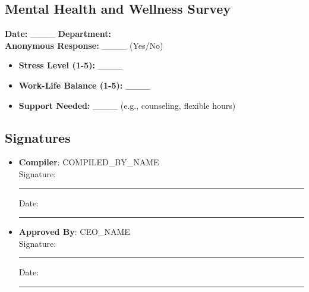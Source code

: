 \documentclass[11pt]{article}
\newcommand{\location}{}
\newcommand{\compilerName}{{{COMPILED_BY_NAME}}}
\begin{document}
\subsection*{Mental Health and Wellness Survey}

\textbf{Date:} \_\_\_\_ \textbf{Department:} \location \\
\textbf{Anonymous Response:} \_\_\_\_ (Yes/No)

\begin{itemize}
    \item \textbf{Stress Level (1-5):} \_\_\_\_
    \item \textbf{Work-Life Balance (1-5):} \_\_\_\_
    \item \textbf{Support Needed:} \_\_\_\_ (e.g., counseling, flexible hours)
\end{itemize}

\subsection*{Signatures}
\begin{itemize}
  \item \textbf{Compiler}: \compilerName \\
    Signature: \rule{5cm}{0.4pt} \quad Date: \rule{3cm}{0.4pt}
  \item \textbf{Approved By}: {{CEO_NAME}} \\
    Signature: \rule{5cm}{0.4pt} \quad Date: \rule{3cm}{0.4pt}
\end{itemize}
\end{document}
